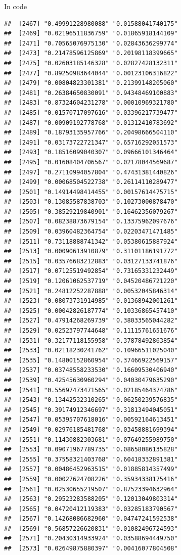 \documentclass[ignorenonframetext,]{beamer}
\begin{document}
\begin{frame}[fragile]{In code}
\begin{verbatim}
##  [2467] "0.49991228980088" "0.01588041740175"
##  [2469] "0.02196511836759" "0.01865918144109"
##  [2471] "0.70565076975130" "0.02843636299774"
##  [2473] "0.21478596125869" "0.20198118399665"
##  [2475] "0.02603185146328" "0.02827428132311"
##  [2477] "0.89250983644044" "0.00123106316822"
##  [2479] "0.00804823301381" "0.21399148205060"
##  [2481] "0.26384650830091" "0.94348469100883"
##  [2483] "0.87324604231278" "0.00010969321780"
##  [2485] "0.01570717097616" "0.03396217739477"
##  [2487] "0.00909192778768" "0.01312410783692"
##  [2489] "0.18793135957766" "0.20498666504110"
##  [2491] "0.03173722721347" "0.65716292051573"
##  [2493] "0.18516099040307" "0.09666101346464"
##  [2495] "0.01608404706567" "0.02178044569687"
##  [2497] "0.27110994057804" "0.47431381440826"
##  [2499] "0.00068504522738" "0.26114110289477"
##  [2501] "0.14914498414455" "0.00157614475715"
##  [2503] "0.13085587838703" "0.10273000878470"
##  [2505] "0.38529219840901" "0.16462356079267"
##  [2507] "0.08238873679154" "0.13375962097676"
##  [2509] "0.03960482364754" "0.02203471471485"
##  [2511] "0.73118888741342" "0.05380615887924"
##  [2513] "0.00090613910879" "0.31101186191772"
##  [2515] "0.03576683212883" "0.03127133741876"
##  [2517] "0.07125519492854" "0.73165331232449"
##  [2519] "0.12061062537719" "0.04520486721220"
##  [2521] "0.24812252287888" "0.00532045846314"
##  [2523] "0.08073731914985" "0.01368942001261"
##  [2525] "0.00042826187774" "0.10336865457410"
##  [2527] "0.47914268269739" "0.38033565044282"
##  [2529] "0.02523797744648" "0.11115761651676"
##  [2531] "0.32177118155958" "0.37878492863854"
##  [2533] "0.02118230241762" "0.10966511025040"
##  [2535] "0.14800152860954" "0.37466922569157"
##  [2537] "0.03748558233530" "0.16609530406940"
##  [2539] "0.42545630960294" "0.04030479635290"
##  [2541] "0.55697473471565" "0.02185464374786"
##  [2543] "0.13442532310265" "0.06250239576835"
##  [2545] "0.39174912346697" "0.31813494045051"
##  [2547] "0.05395707618016" "0.00592164613451"
##  [2549] "0.02976185481768" "0.03458881699394"
##  [2551] "0.11430882303681" "0.07649255989750"
##  [2553] "0.09071967789735" "0.08658086135828"
##  [2555] "0.37558321403768" "0.60418332891381"
##  [2557] "0.00486452963515" "0.01885814357499"
##  [2559] "0.00027624708226" "0.35934338175416"
##  [2561] "0.02530655219507" "0.87523394632964"
##  [2563] "0.29523283588205" "0.12013049803314"
##  [2565] "0.04720412119383" "0.03285183790567"
##  [2567] "0.14268086682960" "0.04747241592538"
##  [2569] "0.56857226620831" "0.01082496724593"
##  [2571] "0.20430314933924" "0.03588694449750"
##  [2573] "0.02649875880397" "0.00416077804508"

\end{verbatim}
\end{frame}
\end{document}

